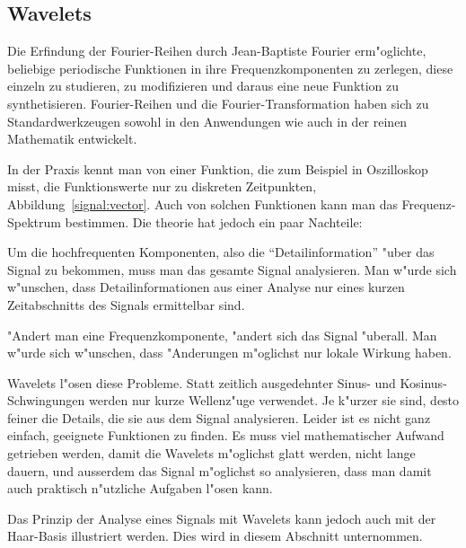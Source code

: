 \subsection{Wavelets\label{subsection-wavelets}}
Die Erfindung der Fourier-Reihen durch Jean-Baptiste Fourier erm"oglichte,
beliebige periodische Funktionen in ihre Frequenzkomponenten zu zerlegen,
diese einzeln zu studieren, zu modifizieren und daraus eine neue Funktion
zu synthetisieren. Fourier-Reihen und die Fourier-Transformation haben
sich zu Standardwerkzeugen sowohl in den Anwendungen wie auch in der
reinen Mathematik entwickelt.

In der Praxis kennt man von einer Funktion, die zum Beispiel in
Oszilloskop misst, die Funktionswerte nur zu diskreten Zeitpunkten,
Abbildung~\ref{signal:vector}.
Auch von solchen Funktionen kann man das Frequenz-Spektrum bestimmen.
Die theorie hat jedoch ein paar Nachteile:
\begin{compactenum}
\item Um die hochfrequenten Komponenten, also die ``Detailinformation''
"uber das Signal zu bekommen, muss man das gesamte Signal analysieren.
Man w"urde sich w"unschen, dass Detailinformationen aus einer Analyse
nur eines kurzen Zeitabschnitts des Signals ermittelbar sind.
\item "Andert man eine Frequenzkomponente, "andert sich das Signal
"uberall. Man w"urde sich w"unschen, dass "Anderungen m"oglichst nur
lokale Wirkung haben.
\end{compactenum}
Wavelets l"osen diese Probleme. Statt zeitlich ausgedehnter Sinus-
und Kosinus-Schwingungen werden nur kurze Wellenz"uge verwendet.
Je k"urzer sie sind, desto feiner die Details, die sie aus dem 
Signal analysieren. Leider ist es nicht ganz einfach, geeignete
Funktionen zu finden. Es muss viel mathematischer Aufwand getrieben
werden, damit die Wavelets m"oglichst glatt werden, nicht lange
dauern, und ausserdem das Signal m"oglichst so analysieren, dass
man damit auch praktisch n"utzliche Aufgaben l"osen kann.

Das Prinzip der Analyse eines Signals mit Wavelets kann jedoch
auch mit der Haar-Basis illustriert werden. Dies wird in diesem
Abschnitt unternommen.

